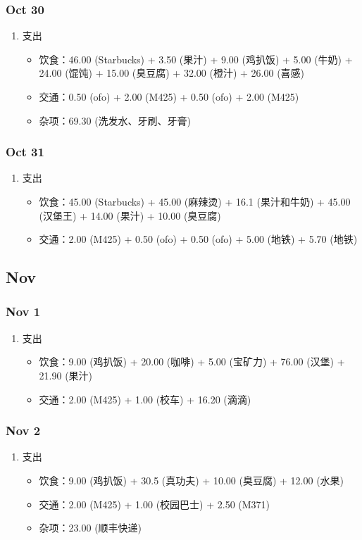 \documentclass[11pt]{article}
\begin{document}
\subsubsection{Oct 30}
\label{sec:orgheadline30}
\begin{enumerate}
\item 支出
\begin{itemize}
\item 饮食：46.00 (Starbucks) + 3.50 (果汁) + 9.00 (鸡扒饭) + 5.00 (牛奶) + 24.00 (馄饨) + 15.00 (臭豆腐) + 32.00 (橙汁) + 26.00 (喜感)
\item 交通：0.50 (ofo) + 2.00 (M425) + 0.50 (ofo) + 2.00 (M425)
\item 杂项：69.30 (洗发水、牙刷、牙膏)
\end{itemize}
\end{enumerate}
\subsubsection{Oct 31}
\label{sec:orgheadline31}
\begin{enumerate}
\item 支出
\begin{itemize}
\item 饮食：45.00 (Starbucks) + 45.00 (麻辣烫) + 16.1 (果汁和牛奶) + 45.00 (汉堡王) + 14.00 (果汁) + 10.00 (臭豆腐)
\item 交通：2.00 (M425) + 0.50 (ofo) + 0.50 (ofo) + 5.00 (地铁) + 5.70 (地铁)
\end{itemize}
\end{enumerate}
\subsection{Nov}
\label{sec:orgheadline39}
\subsubsection{Nov 1}
\label{sec:orgheadline33}
\begin{enumerate}
\item 支出
\begin{itemize}
\item 饮食：9.00 (鸡扒饭) + 20.00 (咖啡) + 5.00 (宝矿力) + 76.00 (汉堡) + 21.90 (果汁)
\item 交通：2.00 (M425) + 1.00 (校车) + 16.20 (滴滴)
\end{itemize}
\end{enumerate}
\subsubsection{Nov 2}
\label{sec:orgheadline34}
\begin{enumerate}
\item 支出
\begin{itemize}
\item 饮食：9.00 (鸡扒饭) + 30.5 (真功夫) + 10.00 (臭豆腐) + 12.00 (水果)
\item 交通：2.00 (M425) + 1.00 (校园巴士) + 2.50 (M371)
\item 杂项：23.00 (顺丰快递)
\end{itemize}
\end{enumerate}
\end{document}
